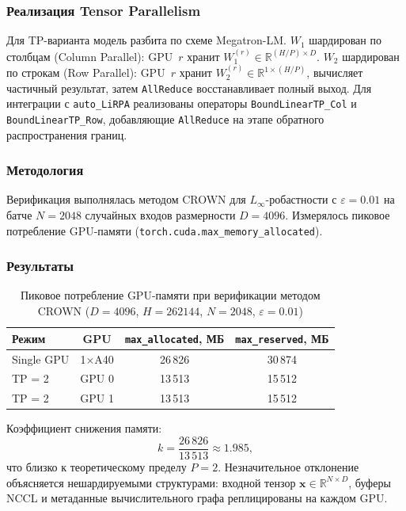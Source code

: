 \subsubsection{Реализация Tensor Parallelism}

Для TP-варианта модель разбита по схеме Megatron-LM\cite{MegatronLM2020}.
$W_1$ шардирован по столбцам (Column Parallel): GPU~$r$ хранит
$W_1^{(r)} \in \mathbb{R}^{(H/P) \times D}$.
$W_2$ шардирован по строкам (Row Parallel): GPU~$r$ хранит
$W_2^{(r)} \in \mathbb{R}^{1 \times (H/P)}$, вычисляет частичный
результат, затем \texttt{AllReduce} восстанавливает полный выход.
Для интеграции с \texttt{auto\_LiRPA}\cite{AutoLiRPARepo} реализованы
операторы \texttt{BoundLinearTP\_Col} и \texttt{BoundLinearTP\_Row},
добавляющие \texttt{AllReduce} на этапе обратного распространения границ.

\subsubsection{Методология}

Верификация выполнялась методом CROWN для $L_\infty$-робастности
с $\varepsilon = 0.01$ на батче $N = 2048$ случайных входов
размерности $D = 4096$.
Измерялось пиковое потребление GPU-памяти
(\texttt{torch.cuda.max\_memory\_allocated}).

\subsubsection{Результаты}

\begin{table}[htbp]
\centering
\caption{Пиковое потребление GPU-памяти при верификации методом CROWN
($D{=}4096$, $H{=}262144$, $N{=}2048$, $\varepsilon{=}0.01$)}
\label{tab:tp-memory}
\begin{tabular}{lccc}
\toprule
Режим & GPU & \texttt{max\_allocated}, МБ & \texttt{max\_reserved}, МБ \\
\midrule
Single GPU & 1$\times$A40 & 26\,826 & 30\,874 \\
TP = 2     & GPU 0        & 13\,513 & 15\,512 \\
TP = 2     & GPU 1        & 13\,513 & 15\,512 \\
\bottomrule
\end{tabular}
\end{table}

Коэффициент снижения памяти:
$$k = \frac{26\,826}{13\,513} \approx 1.985,$$
что близко к теоретическому пределу $P = 2$.
Незначительное отклонение объясняется нешардируемыми структурами:
входной тензор $\mathbf{x} \in \mathbb{R}^{N \times D}$,
буферы NCCL и метаданные вычислительного графа
реплицированы на каждом GPU.

